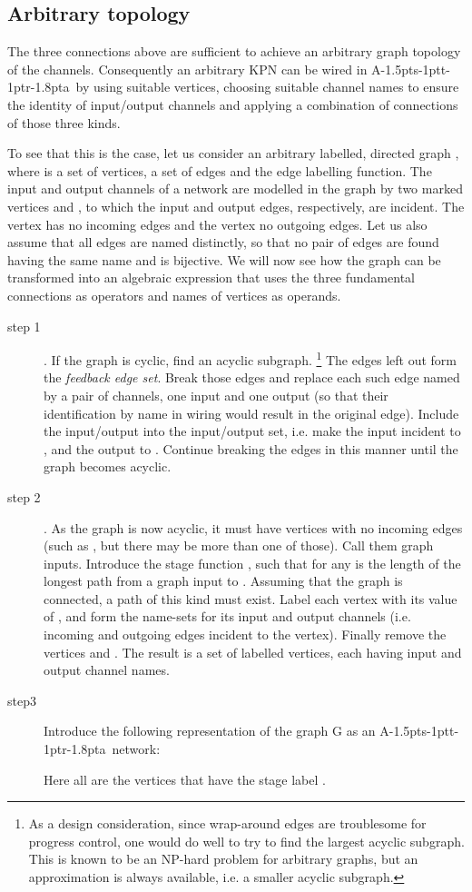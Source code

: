 \documentclass[11pt]{report}
\def\ak{{\textsf{A\kern-1.5pts\kern-1ptt\kern-1ptr\kern-1.8pta}}\kern-2pt{\it K\kern-2ptahn}}
\begin{document}
\subsection{Arbitrary topology}

The three connections above are sufficient to achieve an arbitrary graph topology of the channels. Consequently an arbitrary KPN can be wired in \ak\ by using suitable vertices, choosing suitable channel names to ensure the identity of input/output channels and applying a combination of connections of those three kinds.

To see that this is the case, let us consider an arbitrary labelled, directed graph , where  is a set of vertices,  a set of edges and  the edge labelling function. The input and output channels of a network are modelled in the graph by two marked vertices  and , to which the input and output edges, respectively, are incident. The vertex   has no incoming edges and the vertex  no outgoing edges. Let us also assume that all edges are named distinctly, so that no pair of edges are found having the same name and  is bijective. We will now see how the graph can be transformed into an algebraic expression that uses the three fundamental connections as operators and names of vertices as operands.
\begin{description}
\item[step 1]. If the graph is cyclic, find an acyclic subgraph. \footnote{As a design consideration, since wrap-around edges are troublesome for progress control, one would do well to try to find the largest acyclic subgraph. This is known to be an NP-hard problem for arbitrary graphs, but an approximation is always available, i.e. a smaller acyclic subgraph.} The edges left out form the {\em feedback edge set}.  Break those edges and replace each such edge named  by a pair of channels, one input  and one output  (so that their identification by name in wiring would result in the original edge). Include the input/output  into the input/output set, i.e. make the input  incident to  , and the output  to . Continue breaking the edges in this manner until the graph becomes acyclic.

\item[step 2]. As the graph is now acyclic, it must have vertices with no incoming edges (such as , but there may be more than one of those).
Call them graph inputs. Introduce the stage function , such that for any   is the length of the longest path from a graph input to . Assuming that the graph is connected, a path of this kind must exist. Label each vertex with its value of , and form the name-sets for its input and output channels (i.e. incoming and outgoing edges incident to the vertex). Finally remove the vertices  and . The result is a set of labelled vertices, each having input and output channel names.

\item[step3] Introduce the following representation of the graph G as an \ak\ network:



Here all  are the vertices that have the stage label .
\end{description}
\end{document}
